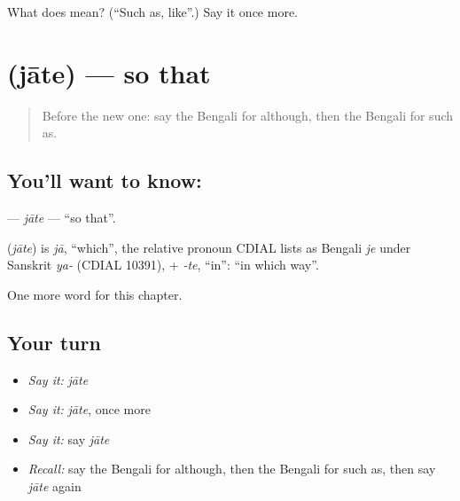\begin{tcolorbox}[breakable,colback=teal!4,colframe=teal!35!black,title={Before you move on}]
What does  mean? (\textquotedblleft{}Such as, like\textquotedblright{}.) Say it once more.
\end{tcolorbox}
\section[\texorpdfstring{\bn{যাতে} (jāte)}{যাতে (jāte)}]{ (jāte) — so that}

\label{lesson:BN-C218-jate}



\begin{quote}
Before the new one: say the Bengali for although, then the Bengali for such as.
\end{quote}

\subsection*{You'll want to know: }
\textbf{} — \emph{jāte} — \textquotedblleft{}so that\textquotedblright{}.

\begin{cousinweb}
\textbf{} (\emph{jāte}) is \emph{jā}, \textquotedblleft{}which\textquotedblright{}, the relative pronoun CDIAL lists as Bengali \emph{je} under Sanskrit \emph{ya-} (CDIAL 10391), + \emph{-te}, \textquotedblleft{}in\textquotedblright{}: \textquotedblleft{}in which way\textquotedblright{}.
\end{cousinweb}

\begin{grammarlens}[title={What you've built}]
One more word for this chapter.
\end{grammarlens}

\subsection*{Your turn}
\begin{itemize}
\raggedright
  \item \emph{Say it:} \emph{jāte}
  \item \emph{Say it:} \emph{jāte}, once more
  \item \emph{Say it:} say \emph{jāte}
  \item \emph{Recall:} say the Bengali for although, then the Bengali for such as, then say \emph{jāte} again
\end{itemize}

